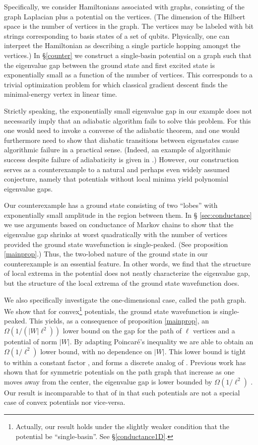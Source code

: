 Specifically, we consider Hamiltonians associated with graphs,
consisting of the graph Laplacian plus a potential on the
vertices. (The dimension of the Hilbert space is the number of
vertices in the graph. The vertices may be labeled with bit strings
corresponding to basis states of a set of
qubits. Physically, one can interpret the Hamiltonian
as describing a single particle hopping amongst the vertices.) In
\S \ref{counter} we construct a single-basin potential on a graph
such that the eigenvalue gap between the ground state and first
excited state is exponentially small as a function of the number of
vertices. This corresponds to a trivial optimization problem for which
classical gradient descent finds the minimal-energy vertex in linear
time.

Strictly speaking, the exponentially small eigenvalue gap in our
example does not necessarily imply that an adiabatic algorithm fails
to solve this problem. For this one would need to invoke a converse of
the adiabatic theorem, and one would furthermore need to show that
diabatic transitions between eigenstates cause algorithmic failure in
a practical sense. (Indeed, an example of algorithmic success despite
failure of adiabaticity is given in \cite{NSK12}.) However, our
construction serves as a counterexample to a natural and perhaps even
widely assumed conjecture, namely that potentials without local
minima yield polynomial eigenvalue gaps. 

Our counterexample has a ground state consisting of two ``lobes'' with
exponentially small amplitude in the region between them. In \S
\ref{sec:conductance} we use arguments based on conductance of Markov
chains to show that the eigenvalue gap shrinks at worst quadratically
with the number of vertices provided the ground state wavefunction is
single-peaked. (See proposition \ref{mainprop}.) Thus, the two-lobed
nature of the ground state in our counterexample is an essential
feature. In other words, we find that the structure of local extrema
in the potential does not neatly characterize the eigenvalue gap, but
the structure of the local extrema of the ground state wavefunction
does.

We also specifically investigate the one-dimensional case, called the
path graph. We show that for convex\footnote{Actually, our result
  holds under the slightly weaker condition that the potential be
  ``single-basin''. See \S \ref{conductance1D}.} potentials, the
ground state wavefunction is single-peaked. This yields, as a consequence
of proposition \ref{mainprop}, an $\Omega(1/(|W|\ell^2))$ lower bound
on the gap for the path of $\ell$ vertices and a potential of norm
$|W|$. By adapting Poincar\'e's inequality we are able to obtain an
$\Omega(1/\ell^2)$ lower bound, with no dependence on $|W|$. This
lower bound is tight to within a constant factor \cite{Jarret_Jordan},
and forms a discrete analog of \cite{PW}. Previous work has shown that
for symmetric potentials on the path graph that increase as one moves
away from the center, the eigenvalue gap is lower bounded by
$\Omega(1/\ell^2)$ \cite{ashbaugh1990some}. Our result is incomparable to that of
\cite{ashbaugh1990some} in that such potentials are not a special case of convex
potentials nor vice-versa.

